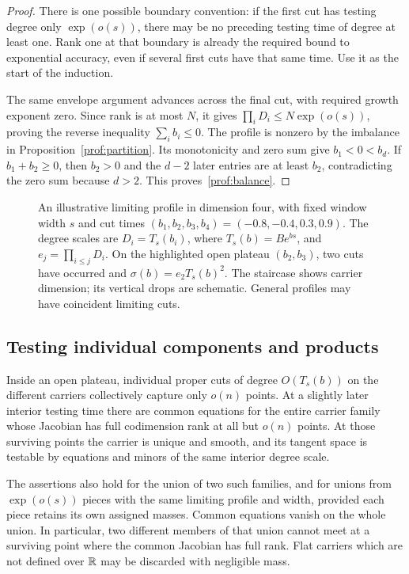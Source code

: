 \begin{proof}
There is one possible boundary convention: if the first cut has
testing degree only $\exp(o(s))$, there may be no preceding testing
time of degree at least one.  Rank one at that boundary is already
the required bound to exponential accuracy, even if several first
cuts have that same time.  Use it as the start of the induction.

The same envelope argument advances across the final cut, with
required growth exponent zero.  Since rank is at most $N$, it gives
$\prod_iD_i\le N\exp(o(s))$, proving the reverse inequality
$\sum_i b_i\le0$.  The profile is nonzero by the imbalance in
Proposition~\ref{prof:partition}.  Its monotonicity and zero sum give
$b_1<0<b_d$.  If $b_1+b_2\ge0$, then $b_2>0$ and the $d-2$ later
entries are at least $b_2$, contradicting the zero sum because
$d>2$.  This proves~\eqref{prof:balance}.
\end{proof}

\begin{figure}[htbp]
\centering

\caption{An illustrative limiting profile in dimension four, with fixed
window width $s$ and cut times $(b_1,b_2,b_3,b_4)=(-0.8,-0.4,0.3,0.9)$.
The degree scales are $D_i=T_s(b_i)$, where $T_s(b)=B e^{bs}$, and
$e_j=\prod_{i\le j}D_i$. On the highlighted open plateau $(b_2,b_3)$,
two cuts have occurred and $\sigma(b)=e_2T_s(b)^2$.
The staircase shows carrier dimension; its vertical drops are schematic.
General profiles may have coincident limiting cuts.}
\label{fig:scale-profile}
\end{figure}
\FloatBarrier

\subsection{Testing individual components and products}

\begin{proposition}\label{prof:regularity}
Inside an open plateau, individual proper cuts of degree $O(T_s(b))$
on the different carriers collectively capture only $o(n)$ points.
At a slightly later interior testing time there are common equations
for the entire carrier family whose Jacobian has full codimension
rank at all but $o(n)$ points.  At those surviving points the carrier
is unique and smooth, and its tangent space is testable by equations
and minors of the same interior degree scale.

The assertions also hold for the union of two such families, and
for unions from $\exp(o(s))$ pieces with the same limiting profile
and width, provided each piece retains its own assigned masses.
Common equations vanish on the whole union.  In particular, two
different members of that union cannot meet at a surviving point
where the common Jacobian has full rank.
Flat carriers which are not defined over $\mathbb R$ may be discarded
with negligible mass.
\end{proposition}

